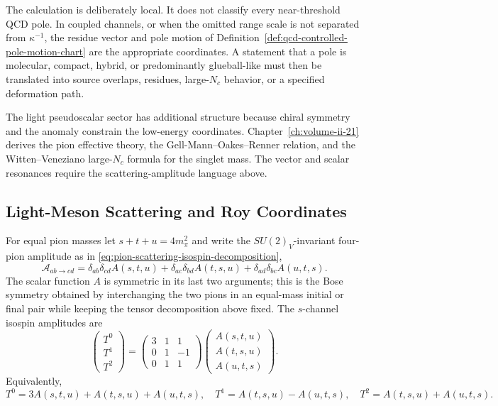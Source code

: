The calculation is deliberately local.  It does not classify every
near-threshold QCD pole.  In coupled channels, or when the omitted range scale
is not separated from \(\kappa^{-1}\), the residue vector and pole motion of
Definition~\ref{def:qcd-controlled-pole-motion-chart} are the appropriate
coordinates.  A statement that a pole is molecular, compact, hybrid, or
predominantly glueball-like must then be translated into source overlaps,
residues, large-\(N_c\) behavior, or a specified deformation path.

The light pseudoscalar sector has additional structure because chiral symmetry
and the anomaly constrain the low-energy coordinates.  Chapter~\ref{ch:volume-ii-21}
derives the pion effective theory, the Gell-Mann--Oakes--Renner relation, and
the Witten--Veneziano large-\(N_c\) formula for the singlet mass.  The vector
and scalar resonances require the scattering-amplitude language above.

\subsection{Light-Meson Scattering and Roy Coordinates}
\label{subsec:qcd-light-meson-roy-coordinates}

\begin{definition}
\label{def:qcd-pipi-isospin-amplitudes}
For equal pion masses let \(s+t+u=4m_\pi^2\) and write the
\(SU(2)_V\)-invariant four-pion amplitude as in
\eqref{eq:pion-scattering-isospin-decomposition},
\[
  \mathcal A_{ab\to cd}
  =
  \delta_{ab}\delta_{cd}A(s,t,u)
  +\delta_{ac}\delta_{bd}A(t,s,u)
  +\delta_{ad}\delta_{bc}A(u,t,s).
\]
The scalar function \(A\) is symmetric in its last two arguments; this is the
Bose symmetry obtained by interchanging the two pions in an equal-mass
initial or final pair while keeping the tensor decomposition above fixed.
The \(s\)-channel isospin amplitudes are
\begin{equation}
  \begin{pmatrix}T^0\\ T^1\\ T^2\end{pmatrix}
  =
  \begin{pmatrix}
    3&1&1\\
    0&1&-1\\
    0&1&1
  \end{pmatrix}
  \begin{pmatrix}
    A(s,t,u)\\ A(t,s,u)\\ A(u,t,s)
  \end{pmatrix}.
  \label{eq:qcd-pipi-isospin-amplitude-matrix}
\end{equation}
Equivalently,
\[
  T^0=3A(s,t,u)+A(t,s,u)+A(u,t,s),\quad
  T^1=A(t,s,u)-A(u,t,s),\quad
  T^2=A(t,s,u)+A(u,t,s).
\]
\end{definition}

